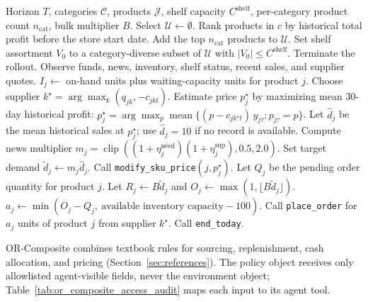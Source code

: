 
\begin{algorithm}[t]
\small
\caption{Privileged Heuristic: quality-based policy}
\label{alg:handcrafted_policy}
\begin{algorithmic}[1]
\Require Horizon $T$, categories $\mathcal{C}$, products $\mathcal{J}$, shelf capacity $C^{\mathrm{shelf}}$, per-category product count $n_{\mathrm{cat}}$, bulk multiplier $B$.
\State Select $\mathcal{U}\leftarrow\emptyset$.
    \State Rank products in $c$ by historical total profit before the store start date.
    \State Add the top $n_{\mathrm{cat}}$ products to $\mathcal{U}$.
\EndFor
\State Set shelf assortment $V_0$ to a category-diverse subset of $\mathcal{U}$ with $|V_0|\le C^{\mathrm{shelf}}$.
        \State Terminate the rollout.
    \EndIf
    \State Observe funds, news, inventory, shelf status, recent sales, and supplier quotes.
        \State $I_j \leftarrow$ on-hand units plus waiting-capacity units for product $j$.
        \State Choose supplier $k^\star=\arg\max_k(q_{jk},-c_{jkt})$.
        \State Estimate price $p^\star_j$ by maximizing mean 30-day historical profit:
        \Statex \hspace{\algorithmicindent} $p^\star_j=\arg\max_p \operatorname{mean}\{(p-c_{jk^\star t})\,y_{j\tau}:p_{j\tau}=p\}$.
        \State Let $\hat d_j$ be the mean historical sales at $p^\star_j$; use $\hat d_j=10$ if no record is available.
        \State Compute news multiplier $m_j=\operatorname{clip}((1+\eta^{\mathrm{need}}_j)(1+\eta^{\mathrm{sup}}_j),0.5,2.0)$.
        \State Set target demand $\tilde d_j \leftarrow m_j\hat d_j$.
            \State Call \texttt{modify\_sku\_price}$(j,p^\star_j)$.
        \EndIf
        \State Let $Q_j$ be the pending order quantity for product $j$.
        \State Let $R_j\leftarrow B\tilde d_j$ and $O_j\leftarrow \max(1,\lfloor B\tilde d_j\rfloor)$.
            \State $a_j\leftarrow \min(O_j-Q_j,\ \text{available inventory capacity}-100)$.
                \State Call \texttt{place\_order} for $a_j$ units of product $j$ from supplier $k^\star$.
            \EndIf
        \EndIf
    \EndFor
    \State Call \texttt{end\_today}.
\EndFor
\end{algorithmic}
\end{algorithm}

OR-Composite combines textbook rules for sourcing, replenishment, cash allocation, and pricing (Section~\ref{sec:references}). The policy object receives only allowlisted agent-visible fields, never the environment object; Table~\ref{tab:or_composite_access_audit} maps each input to its agent tool.


